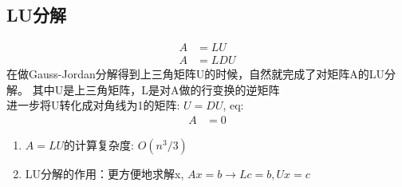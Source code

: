 \documentclass{book}
\begin{document}
\subsection{LU分解}
\begin{equation}
  \begin{aligned}
    A&=LU\\ 
    A&=LDU
  \end{aligned}
  \label{eq: LU1}
\end{equation}
在做Gauss-Jordan分解得到上三角矩阵U的时候，自然就完成了对矩阵A的LU分解。
其中U是上三角矩阵，L是对A做的行变换的逆矩阵\\ 
进一步将U转化成对角线为1的矩阵: $U=DU$, eq:
\begin{equation*}
  \begin{aligned}
    A&= 0
  \end{aligned}
  \label{eq: LU2}
\end{equation*}

\begin{enumerate}
  \item $A=LU$的计算复杂度: $O(n^3/3)$
  \item LU分解的作用：更方便地求解x, $Ax=b \rightarrow Lc= b, Ux=c$
\end{enumerate}
\end{document}
